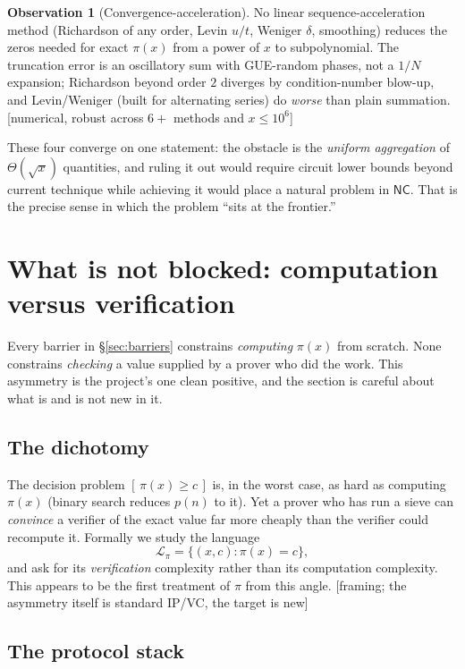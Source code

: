 \documentclass[11pt]{article}
\theoremstyle{plain}
\theoremstyle{definition}
\newtheorem{observation}[theorem]{Observation}
\theoremstyle{remark}
\newcommand{\stat}[1]{\quad\textnormal{\footnotesize\textsf{[\textcolor{accent}{#1}]}}}
\newcommand{\Lpi}{\mathcal{L}_{\pi}}
\newcommand{\NC}{\mathsf{NC}}
\begin{document}
\begin{observation}[Convergence-acceleration]
\label{obs:accel}
No linear sequence-acceleration method (Richardson of any order, Levin $u/t$,
Weniger $\delta$, smoothing) reduces the zeros needed for exact $\pi(x)$ from a
power of $x$ to subpolynomial. The truncation error is an oscillatory sum with
GUE-random phases, not a $1/N$ expansion; Richardson beyond order $2$ diverges by
condition-number blow-up, and Levin/Weniger (built for alternating series) do
\emph{worse} than plain summation.
\stat{numerical, robust across $6{+}$ methods and $x\le10^6$}
\end{observation}

These four converge on one statement: the obstacle is the \emph{uniform
aggregation} of $\Theta(\sqrt{x})$ quantities, and ruling it out would require
circuit lower bounds beyond current technique while achieving it would place a
natural problem in $\NC$. That is the precise sense in which the problem ``sits at
the frontier.''

\section{What is not blocked: computation versus verification}
\label{sec:verification}

Every barrier in \S\ref{sec:barriers} constrains \emph{computing} $\pi(x)$ from
scratch. None constrains \emph{checking} a value supplied by a prover who did the
work. This asymmetry is the project's one clean positive, and the section is
careful about what is and is not new in it.

\subsection{The dichotomy}

The decision problem $[\,\pi(x)\ge c\,]$ is, in the worst case, as hard as
computing $\pi(x)$ (binary search reduces $p(n)$ to it). Yet a prover who has run
a sieve can \emph{convince} a verifier of the exact value far more cheaply than
the verifier could recompute it. Formally we study the language
\[
  \Lpi = \{(x,c) : \pi(x)=c\},
\]
and ask for its \emph{verification} complexity rather than its computation
complexity. This appears to be the first treatment of $\pi$ from this angle.
\stat{framing; the asymmetry itself is standard IP/VC, the target is new}

\subsection{The protocol stack}
\end{document}
